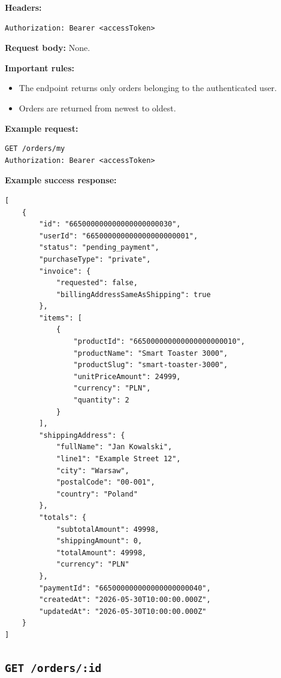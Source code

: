 \textbf{Headers:}

\begin{verbatim}
Authorization: Bearer <accessToken>
\end{verbatim}

\textbf{Request body:} None.

\textbf{Important rules:}

\begin{itemize}
    \item The endpoint returns only orders belonging to the authenticated user.
    \item Orders are returned from newest to oldest.
\end{itemize}

\textbf{Example request:}

\begin{verbatim}
GET /orders/my
Authorization: Bearer <accessToken>
\end{verbatim}

\pagebreak
\textbf{Example success response:}

\begin{verbatim}
[
    {
        "id": "665000000000000000000030",
        "userId": "665000000000000000000001",
        "status": "pending_payment",
        "purchaseType": "private",
        "invoice": {
            "requested": false,
            "billingAddressSameAsShipping": true
        },
        "items": [
            {
                "productId": "665000000000000000000010",
                "productName": "Smart Toaster 3000",
                "productSlug": "smart-toaster-3000",
                "unitPriceAmount": 24999,
                "currency": "PLN",
                "quantity": 2
            }
        ],
        "shippingAddress": {
            "fullName": "Jan Kowalski",
            "line1": "Example Street 12",
            "city": "Warsaw",
            "postalCode": "00-001",
            "country": "Poland"
        },
        "totals": {
            "subtotalAmount": 49998,
            "shippingAmount": 0,
            "totalAmount": 49998,
            "currency": "PLN"
        },
        "paymentId": "665000000000000000000040",
        "createdAt": "2026-05-30T10:00:00.000Z",
        "updatedAt": "2026-05-30T10:00:00.000Z"
    }
]
\end{verbatim}

\subsection{\texttt{GET /orders/:id}}

